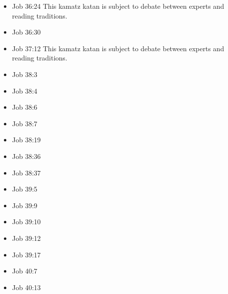 \documentclass[14pt]{article}
\begin{document}
\begin{multicols}{2}
\begin{itemize}
															\item Job 36:24 This kamatz katan is subject to debate between experts and reading traditions.
															
															\item Job 36:30
															
															\item Job 37:12 This kamatz katan is subject to debate between experts and reading traditions.
															
															\item Job 38:3
															
															\item Job 38:4
															
															\item Job 38:6
															
															\item Job 38:7
															
															\item Job 38:19
															
															\item Job 38:36
															
															\item Job 38:37
															
															\item Job 39:5
															
															\item Job 39:9
															
															\item Job 39:10
															
															\item Job 39:12
															
															\item Job 39:17
															
															\item Job 40:7
															
															\item Job 40:13
															

\end{itemize}
\end{multicols}
\end{document}
